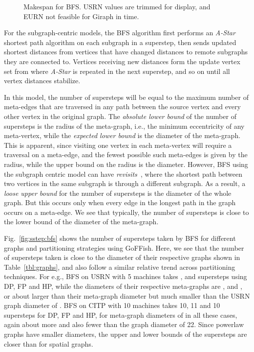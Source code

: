 \documentclass[10pt,conference, compsocconf]{IEEEtran}
\begin{document}
\begin{figure*}[!ht]
\centering {}
\caption{Makespan for BFS. USRN values are trimmed for display, and EURN not feasible for Giraph in time.}
\label{fig:makespan-SSSP}
\vspace{-0.1in}
\end{figure*}
For the subgraph-centric models, the BFS algorithm first performs an \emph{A-Star}~\cite{astar,goffish} shortest path algorithm on each subgraph in a superstep, then sends updated shortest distances from vertices that have changed distances to remote subgraphs they are connected to. Vertices receiving new distances form the update vertex set from where \emph{A-Star} is repeated in the next superstep, and so on until all vertex distances stabilize.

In this model, the number of supersteps will be equal to the maximum number of meta-edges that are traversed in any path between the source vertex and every other vertex in the original graph.
The \emph{absolute lower bound} of the number of supersteps is the radius of the meta-graph, i.e., the minimum eccentricity of any meta-vertex, while the \emph{expected lower bound} is the diameter of the meta-graph. This is apparent, since visiting one vertex in each meta-vertex will require a traversal on a meta-edge, and the fewest possible such meta-edges is given by the radius, while the upper bound on the radius is the diameter. However, BFS using the subgraph centric model can have \emph{revisits}~\cite{dindokar:parlearning:2015}, where the shortest path between two vertices in the same subgraph is through a different subgraph. As a result, a \emph{loose upper bound} for the number of supersteps is the diameter of the whole graph. But this occurs only when every edge in the longest path in the graph occurs on a meta-edge. We see that typically, the number of supersteps is close to the lower bound of the diameter of the meta-graph. 
 
Fig.~\ref{fig:sstep:bfs} shows the number of supersteps taken by BFS for  different graphs and partitioning strategies using GoFFish. Here, we see that the number of supersteps taken is close to the diameter of their respective graphs shown in Table~\ref{tbl:graphs}, and also follow a similar relative trend across partitioning techniques. For e.g., BFS on USRN with 5 machines takes ,  and  supersteps using DP, FP and HP, while the diameters of their respective meta-graphs are ,  and , or about  larger than their meta-graph diameter but much smaller than the USRN graph diameter of . BFS on CITP with 10 machines takes 10, 11 and 10 supersteps for DP, FP and HP, for meta-graph diameters of  in all these cases, again about  more and also fewer than the graph diameter of 22. Since powerlaw graphs have smaller diameters, the upper and lower bounds of the supersteps are closer than for spatial graphs.
\end{document}
